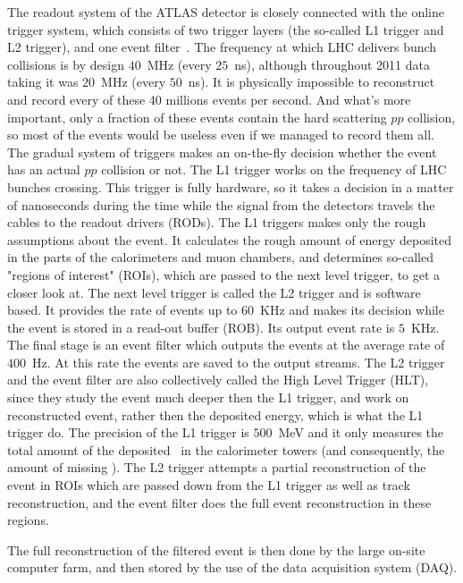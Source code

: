 The readout system of the ATLAS detector is closely connected with the online trigger system, which consists of two trigger layers (the so-called L1 trigger and L2 trigger), and one event filter~\cite{lib:trigger}. The frequency at which LHC delivers bunch collisions is by design $40$~MHz (every $25$~ns), although throughout 2011 data taking it was $20$~MHz (every $50$~ns). It is physically impossible to reconstruct and record every of these 40 millions events per second. And what's more important, only a fraction of these events contain the hard scattering $pp$ collision, so most of the events would be useless even if we managed to record them all. The gradual system of triggers makes an on-the-fly decision whether the event has an actual $pp$ collision or not. The L1 trigger works on the frequency of LHC bunches crossing. This trigger is fully hardware, so it takes a decision in a matter of nanoseconds during the time while the signal from the detectors travels the cables to the readout drivers (RODs). The L1 triggers makes only the rough assumptions about the event. It calculates the rough amount of energy deposited in the parts of the calorimeters and muon chambers, and determines so-called "regions of interest" (ROIs), which are passed to the next level trigger, to get a closer look at. The next level trigger is called the L2 trigger and is software based. It provides the rate of events up to $60$~KHz and makes its decision while the event is stored in a read-out buffer (ROB). Its output event rate is $5$~KHz. The final stage is an event filter which outputs the events at the average rate of $400$~Hz. At this rate the events are saved to the output streams. The L2 trigger and the event filter are also collectively called the High Level Trigger (HLT), since they study the event much deeper then the L1 trigger, and work on reconstructed event, rather then the deposited energy, which is what the L1 trigger do. The precision of the L1 trigger is $500$~MeV and it only measures the total amount of the deposited \et\ in the calorimeter towers (and consequently, the amount of missing \et). The L2 trigger attempts a partial reconstruction of the event in ROIs which are passed down from the L1 trigger as well as track reconstruction, and the event filter does the full event reconstruction in these regions.

The full reconstruction of the filtered event is then done by the large on-site computer farm, and then stored by the use of the data acquisition system (DAQ).
